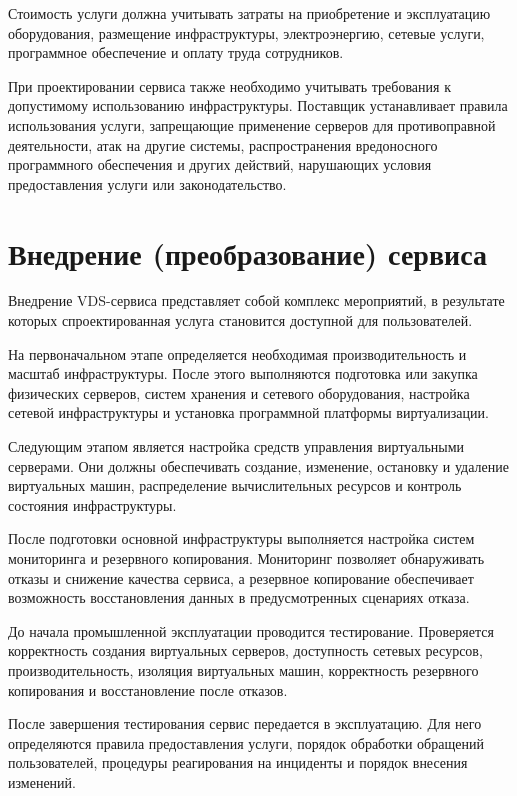 \documentclass[14pt,a4paper]{extarticle}
\begin{document}
    Стоимость услуги должна учитывать затраты на приобретение и эксплуатацию
    оборудования, размещение инфраструктуры, электроэнергию, сетевые услуги,
    программное обеспечение и оплату труда сотрудников.

    При проектировании сервиса также необходимо учитывать требования к допустимому
    использованию инфраструктуры. Поставщик устанавливает правила использования
    услуги, запрещающие применение серверов для противоправной деятельности, атак
    на другие системы, распространения вредоносного программного обеспечения и
    других действий, нарушающих условия предоставления услуги или законодательство.

    \section{Внедрение (преобразование) сервиса}

    Внедрение VDS-сервиса представляет собой комплекс мероприятий, в результате
    которых спроектированная услуга становится доступной для пользователей.

    На первоначальном этапе определяется необходимая производительность и масштаб
    инфраструктуры. После этого выполняются подготовка или закупка физических
    серверов, систем хранения и сетевого оборудования, настройка сетевой
    инфраструктуры и установка программной платформы виртуализации.

    Следующим этапом является настройка средств управления виртуальными серверами.
    Они должны обеспечивать создание, изменение, остановку и удаление виртуальных
    машин, распределение вычислительных ресурсов и контроль состояния
    инфраструктуры.

    После подготовки основной инфраструктуры выполняется настройка систем
    мониторинга и резервного копирования. Мониторинг позволяет обнаруживать отказы
    и снижение качества сервиса, а резервное копирование обеспечивает возможность
    восстановления данных в предусмотренных сценариях отказа.

    До начала промышленной эксплуатации проводится тестирование. Проверяется
    корректность создания виртуальных серверов, доступность сетевых ресурсов,
    производительность, изоляция виртуальных машин, корректность резервного
    копирования и восстановление после отказов.

    После завершения тестирования сервис передается в эксплуатацию. Для него
    определяются правила предоставления услуги, порядок обработки обращений
    пользователей, процедуры реагирования на инциденты и порядок внесения
    изменений.
\end{document}
